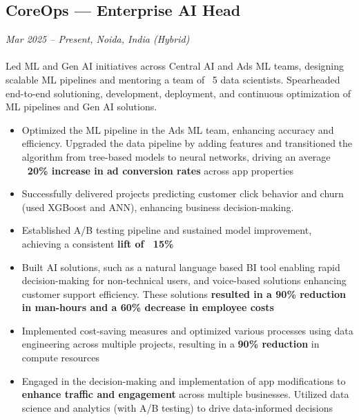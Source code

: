 \documentclass[a4paper,10pt]{article}
\begin{document}
\subsection*{CoreOps — Enterprise AI Head}
\textit{Mar 2025 – Present, Noida, India (Hybrid)} \\
\\
Led ML and Gen AI initiatives across Central AI and Ads ML teams, designing scalable ML pipelines and mentoring a team of ~5 data scientists. Spearheaded end-to-end solutioning, development, deployment, and continuous optimization of ML pipelines and Gen AI solutions.
\begin{itemize}
    \item Optimized the ML pipeline in the Ads ML team, enhancing accuracy and efficiency. Upgraded the data pipeline by adding features and transitioned the algorithm from tree-based models to neural networks, driving an average \textbf{~20\% increase in ad conversion rates} across app properties
    \item Successfully delivered projects predicting customer click behavior and churn (used XGBoost and ANN), enhancing business decision-making.
    \item Established A/B testing pipeline and sustained model improvement, achieving a consistent \textbf{lift of ~15\%}
    \item Built AI solutions, such as a natural language based BI tool enabling rapid decision-making for non-technical users, and voice-based solutions enhancing customer support efficiency. These solutions \textbf{resulted in a 90\% reduction in man-hours and a 60\% decrease in employee costs}
    \item Implemented cost-saving measures and optimized various processes using data engineering across multiple projects, resulting in a \textbf{90\% reduction} in compute resources
    \item Engaged in the decision-making and implementation of app modifications to \textbf{enhance traffic and engagement} across multiple businesses. Utilized data science and analytics (with A/B testing) to drive data-informed decisions
\end{itemize}
\end{document}
